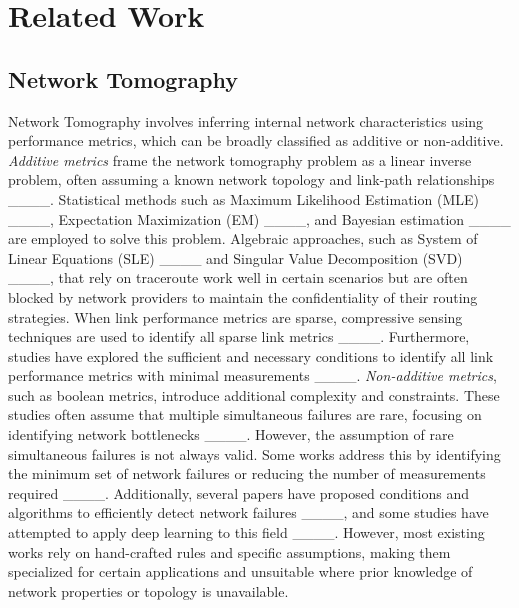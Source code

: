 \section{Related Work}
\label{sec:related work}

\subsection{Network Tomography}
Network Tomography involves inferring internal network characteristics using performance metrics, which can be broadly classified as additive or non-additive. \textit{Additive metrics} frame the network tomography problem as a linear inverse problem, often assuming a known network topology and link-path relationships ____. Statistical methods such as Maximum Likelihood Estimation (MLE) ____, Expectation Maximization (EM) ____, and Bayesian estimation ____ are employed to solve this problem. Algebraic approaches, such as System of Linear Equations (SLE) ____ and Singular Value Decomposition (SVD) ____, that rely on traceroute work well in certain scenarios but are often blocked by network providers to maintain the confidentiality of their routing strategies. When link performance metrics are sparse, compressive sensing techniques are used to identify all sparse link metrics ____. Furthermore, studies have explored the sufficient and necessary conditions to identify all link performance metrics with minimal measurements ____. \textit{Non-additive metrics}, such as boolean metrics, introduce additional complexity and constraints. These studies often assume that multiple simultaneous failures are rare, focusing on identifying network bottlenecks ____. However, the assumption of rare simultaneous failures is not always valid. Some works address this by identifying the minimum set of network failures or reducing the number of measurements required ____. Additionally, several papers have proposed conditions and algorithms to efficiently detect network failures ____, and some studies have attempted to apply deep learning to this field ____. However, most existing works rely on hand-crafted rules and specific assumptions, making them specialized for certain applications and unsuitable where prior knowledge of network properties or topology is unavailable.

